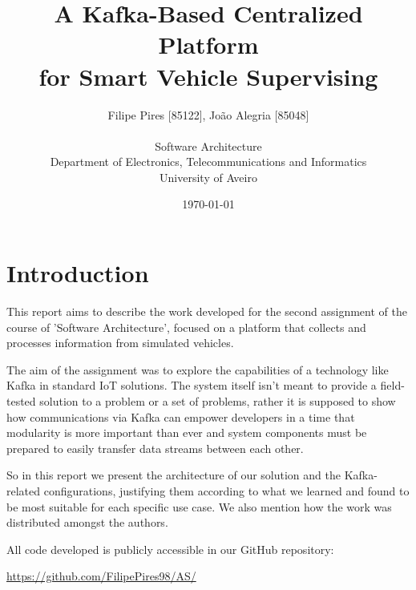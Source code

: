 \documentclass[12pt]{article}
\title{A Kafka-Based Centralized Platform\\for Smart Vehicle Supervising}
\author
{Filipe Pires [85122], João Alegria [85048]\\
\\
Software Architecture\\
\normalsize{Department of Electronics, Telecommunications and Informatics}\\
\normalsize{University of Aveiro}\\
}
\date{\today{}}
\begin{document}
 

\baselineskip18pt

\maketitle 

\section*{Introduction} %

This report aims to describe the work developed for the second assignment of the course of 'Software Architecture', focused on a platform that collects and 
processes information from simulated vehicles.

The aim of the assignment was to explore the capabilities of a technology like Kafka in standard IoT solutions.
The system itself isn't meant to provide a field-tested solution to a problem or a set of problems, rather it is supposed to show how communications via Kafka 
can empower developers in a time that modularity is more important than ever and system components must be prepared to easily transfer data streams between each other.

So in this report we present the architecture of our solution and the Kafka-related configurations, justifying them according to what we learned and found to be 
most suitable for each specific use case.
We also mention how the work was distributed amongst the authors.

All code developed is publicly accessible in our GitHub repository:

\url{https://github.com/FilipePires98/AS/}

\end{document}
